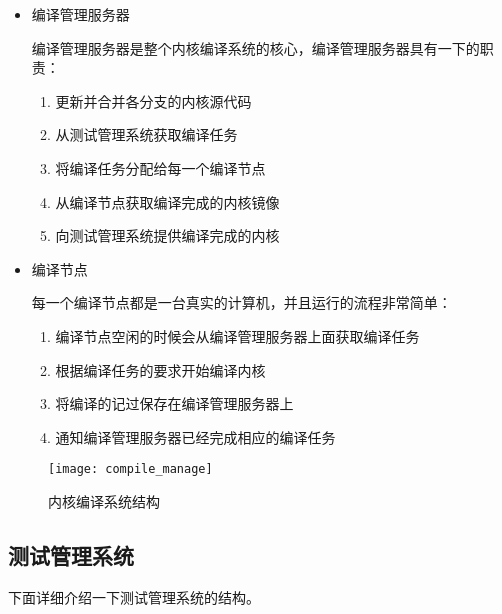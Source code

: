 \begin{itemize}
\item 编译管理服务器

编译管理服务器是整个内核编译系统的核心，编译管理服务器具有一下的职责：

\begin{enumerate}
\item 更新并合并各分支的内核源代码
\item 从测试管理系统获取编译任务
\item 将编译任务分配给每一个编译节点
\item 从编译节点获取编译完成的内核镜像
\item 向测试管理系统提供编译完成的内核
\end{enumerate}

\item 编译节点

每一个编译节点都是一台真实的计算机，并且运行的流程非常简单：
\begin{enumerate}
\item 编译节点空闲的时候会从编译管理服务器上面获取编译任务
\item 根据编译任务的要求开始编译内核
\item 将编译的记过保存在编译管理服务器上
\item 通知编译管理服务器已经完成相应的编译任务
\end{enumerate}

\end{itemize}


\begin{figure}[H]
\centering
\texttt{[image: compile\_manage]}
\caption{内核编译系统结构}
\label{fig:compile_manage}
\end{figure}

\subsection{测试管理系统}

下面详细介绍一下测试管理系统的结构。

